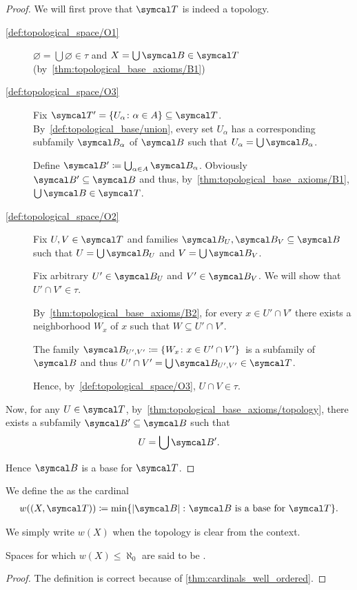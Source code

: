 \begin{proof}
  We will first prove that $\Cal{T}$ is indeed a topology.

  \begin{description}
    \item[\ref{def:topological_space/O1}] $\varnothing = \bigcup \varnothing \in \tau$ and $X = \bigcup \Cal{B} \in \Cal{T}$ (by~\ref{thm:topological_base_axioms/B1})

    \item[\ref{def:topological_space/O3}] Fix $\Cal{T}' = \{ U_\alpha \colon \alpha \in A \} \subseteq \Cal{T}$. By~\cref{def:topological_base/union}, every set $U_\alpha$ has a corresponding subfamily $\Cal{B}_\alpha$ of $\Cal{B}$ such that $U_\alpha = \bigcup \Cal{B}_\alpha$.

    Define $\Cal{B}' \coloneqq \bigcup_{\alpha \in A} \Cal{B}_\alpha$. Obviously $\Cal{B}' \subseteq \Cal{B}$ and thus, by~\ref{thm:topological_base_axioms/B1}, $\bigcup \Cal{B} \in \Cal{T}$.

    \item[\ref{def:topological_space/O2}] Fix $U, V \in \Cal{T}$ and families $\Cal{B}_U, \Cal{B}_V \subseteq \Cal{B}$ such that $U = \bigcup \Cal{B}_U$ and $V = \bigcup \Cal{B}_V$.

    Fix arbitrary $U' \in \Cal{B}_U$ and $V' \in \Cal{B}_V$. We will show that $U' \cap V' \in \tau$.

    By~\ref{thm:topological_base_axioms/B2}, for every $x \in U' \cap V'$ there exists a neighborhood $W_x$ of $x$ such that $W \subseteq U' \cap V'$.

    The family $\Cal{B}_{U',V'} \coloneqq \{ W_x \colon x \in U' \cap V' \}$~\AOC is a subfamily of $\Cal{B}$ and thus $U' \cap V' = \bigcup \Cal{B}_{U',V'} \in \Cal{T}$.

    Hence, by~\ref{def:topological_space/O3}, $U \cap V \in \tau$.
  \end{description}

  Now, for any $U \in \Cal{T}$, by~\cref{thm:topological_base_axioms/topology}, there exists a subfamily $\Cal{B}' \subseteq \Cal{B}$ such that
  \begin{align*}
    U = \bigcup \Cal{B}'.
  \end{align*}

  Hence $\Cal{B}$ is a base for $\Cal{T}$.
\end{proof}

\begin{definition}\label{def:topological_space_weight}
  We define the  as the cardinal
  \begin{align*}
    w((X, \Cal{T})) \coloneqq \min \{ \Abs{\Cal{B}} \colon \Cal{B} \text{ is a base for } \Cal{T} \}.
  \end{align*}

  We simply write $w(X)$ when the topology is clear from the context.

  Spaces for which $w(X) \leq \aleph_0$ are said to be .
\end{definition}
\begin{proof}
  The definition is correct because of \cref{thm:cardinals_well_ordered}.
\end{proof}

